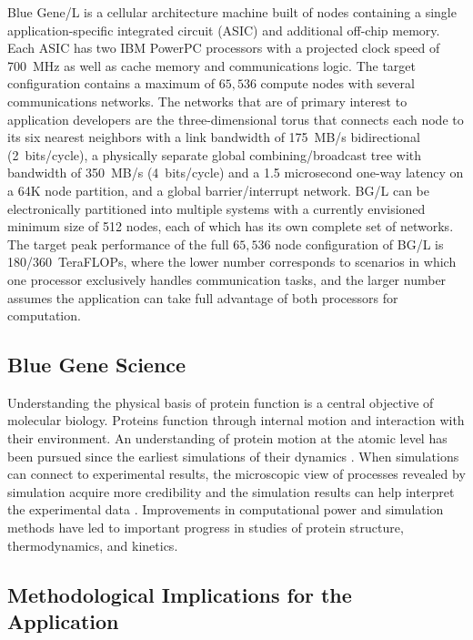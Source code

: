 \documentclass[doublespacing]{elsart}
\begin{document}
Blue Gene/L is a cellular architecture machine built of nodes
containing a single application-specific integrated circuit (ASIC) and
additional off-chip memory.  Each ASIC has two IBM PowerPC processors
with a projected clock speed of 700~MHz as well as cache memory and
communications logic.  The target configuration contains a maximum of
$65,536$ compute nodes with several communications networks.  The
networks that are of primary interest to application developers are
the three-dimensional torus that connects each node to its six nearest
neighbors with a link bandwidth of 175~MB/s bidirectional
(2~bits/cycle), a physically separate global combining/broadcast tree
with bandwidth of 350~MB/s (4~bits/cycle) and a 1.5 microsecond
one-way latency on a 64K node partition, and a global
barrier/interrupt network.  BG/L can be electronically partitioned
into multiple systems with a currently envisioned minimum size of 512
nodes, each of which has its own complete set of networks.  The target
peak performance of the full $65,536$ node configuration of BG/L is
180/360~TeraFLOPs, where the lower number corresponds to scenarios in
which one processor exclusively handles communication tasks, and the
larger number assumes the application can take full advantage of both
processors for computation.

\subsection{Blue Gene Science}

Understanding the physical basis of protein function is a central
objective of molecular biology.  Proteins function through internal
motion and interaction with their environment. An understanding of
protein motion at the atomic level has been pursued since the earliest
simulations of their dynamics \cite{karplus:2002}.  When simulations
can connect to experimental results, the microscopic view of processes
revealed by simulation acquire more credibility and the simulation
results can help interpret the experimental data \cite{nagle:2000}.
Improvements in computational power and simulation methods have led to
important progress in studies of protein structure, thermodynamics, and
kinetics\cite{karplus:2002,sheinerman:98,duan:1998,snow:2002}.

\subsection{Methodological Implications for the Application}
\end{document}
